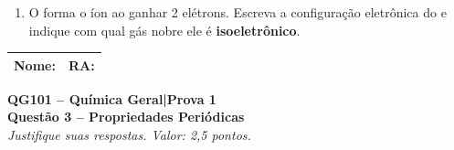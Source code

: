 \documentclass[10pt,a4paper]{article}
\newcommand{\nomera}{%
  \noindent
  \begin{tabular}{|p{0.65\textwidth}|p{0.28\textwidth}|}
    \rule{0pt}{1.8em}Nome:\hfill & RA:\hfill\rule{0pt}{1.8em} \\
    \hline
  \end{tabular}%
  \vspace{0.4cm}
}
\newcommand{\cabecalho}[1]{%
  \begin{center}
    {\large\bfseries QG101 -- Química Geral\quad|\quad Prova 1}\\[2pt]
    {\bfseries #1}\\[2pt]
    \textit{Justifique suas respostas. Valor: 2,5 pontos.}
  \end{center}
  \vspace{0.2cm}
}
\begin{document}
\begin{enumerate}[label=\textbf{\alph*)}]
        \vspace{0.5cm}
        \begin{center}
        \renewcommand{\arraystretch}{1.5}
        \begin{tabular}{c}
          \underline{\hspace{1.8em}} \\
          $1s$
        \end{tabular}
        \quad
        \begin{tabular}{c}
          \underline{\hspace{1.8em}} \\
          $2s$
        \end{tabular}
        \quad
        \begin{tabular}{ccc}
          \underline{\hspace{1.8em}} & \underline{\hspace{1.8em}} & \underline{\hspace{1.8em}} \\
          \multicolumn{3}{c}{$2p$}
        \end{tabular}
        \end{center}

        \vspace{0.6cm}
        Quantos elétrons \textbf{desemparelhados} o  possui?
        O  é paramagnético ou diamagnético? Justifique.

        \vspace{2cm}

  \item O  forma o íon  ao ganhar 2 elétrons.
        Escreva a configuração eletrônica do  e indique
        com qual gás nobre ele é \textbf{isoeletrônico}.

        \vspace{2.5cm}

\end{enumerate}

\newpage

\nomera
\cabecalho{Questão 3 -- Propriedades Periódicas}
\end{document}
